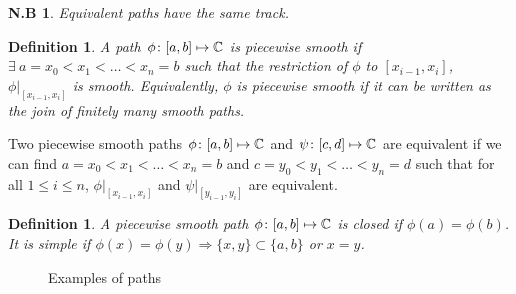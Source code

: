 \documentclass{notes}
\theoremstyle{plain}
\newtheorem{definition}[proposition]{Definition}
\newtheorem*{notes}{N.B}
\begin{document}
\begin{notes}
Equivalent paths have the same track.
\end{notes}

\begin{definition}
A path $\phi \colon [a,b] \mapsto \mathbb{C}$ is piecewise smooth%
 if
$\exists\ a=x_0 < x_1 < \dots < x_n = b$ such that the restriction of $\phi$
to $[x_{i-1},x_i]$, $\phi \bigr|_{[x_{i-1},x_i]}$ is smooth.  Equivalently,
$\phi$ is piecewise smooth if it can be written as the join of finitely many
smooth paths.
\end{definition}

Two piecewise smooth paths $\phi \colon [a,b] \mapsto \mathbb{C}$ and $\psi \colon [c,d] \mapsto
\mathbb{C}$ are equivalent if we can find $a = x_0 < x_1 < \dots < x_n = b$ and
$c = y_0 < y_1 < \dots < y_n = d$ such that for all $1 \le i \le n$,
$\phi \bigr|_{[x_{i-1},x_i]}$ and $\psi \bigr|_{[y_{i-1},y_i]}$ are equivalent.

\begin{definition}
A piecewise smooth path $\phi \colon [a,b] \mapsto \mathbb{C}$ is closed%
 if $\phi(a) = \phi(b)$.  It is simple if%
 $\phi(x) = \phi(y) \Rightarrow \{x,y\} \subset
\{a,b\}$ or $x=y$.
\end{definition}
\begin{figure}[h]
\begin{center}
\end{center}
\caption{Examples of paths}
\end{figure} 
\end{document}
